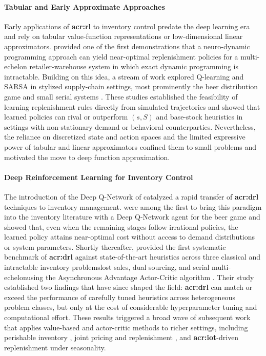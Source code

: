 \paragraph{\textbf{Tabular and Early Approximate Approaches}}
Early applications of \textbf{{acr:rl}} to inventory control predate the deep learning era and rely on tabular value-function representations or low-dimensional linear approximators. \citet{vanroy1997neurodp} provided one of the first demonstrations that a neuro-dynamic programming approach can yield near-optimal replenishment policies for a multi-echelon retailer-warehouse system in which exact dynamic programming is intractable. Building on this idea, a stream of work explored Q-learning and SARSA in stylized supply-chain settings, most prominently the beer distribution game and small serial systems \citep[e.g.,][]{giannoccaro2002rl, kim2008rl, chaharsooghi2008rl, jiang2009rl, mortazavi2015rl}. These studies established the feasibility of learning replenishment rules directly from simulated trajectories and showed that learned policies can rival or outperform $(s,S)$ and base-stock heuristics in settings with non-stationary demand or behavioral counterparties. Nevertheless, the reliance on discretized state and action spaces and the limited expressive power of tabular and linear approximators confined them to small problems and motivated the move to deep function approximation.

\paragraph{\textbf{Deep Reinforcement Learning for Inventory Control}}
The introduction of the Deep Q-Network of \citet{mnih2015dqn} catalyzed a rapid transfer of \textbf{{acr:drl}} techniques to inventory management. \citet{oroojlooyjadid2022dqn} were among the first to bring this paradigm into the inventory literature with a Deep Q-Network agent for the beer game and showed that, even when the remaining stages follow irrational policies, the learned policy attains near-optimal cost without access to demand distributions or system parameters. Shortly thereafter, \citet{gijsbrechts2022a3c} provided the first systematic benchmark of \textbf{{acr:drl}} against state-of-the-art heuristics across three classical and intractable inventory problems\textemdash lost sales, dual sourcing, and serial multi-echelon\textemdash using the Asynchronous Advantage Actor-Critic algorithm \citep{mnih2016a3c}. Their study established two findings that have since shaped the field: \textbf{{acr:drl}} can match or exceed the performance of carefully tuned heuristics across heterogeneous problem classes, but only at the cost of considerable hyperparameter tuning and computational effort. These results triggered a broad wave of subsequent work that applies value-based and actor-critic methods to richer settings, including perishable inventory \citep[e.g.,][]{selukar2022perishable}, joint pricing and replenishment \citep[e.g.,][]{liu2023jointpricing}, and \textbf{{acr:iot}}-driven replenishment under seasonality.

